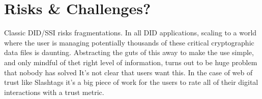 \section{Risks \& Challenges?}
Classic DID/SSI risks fragmentations. 
In all DID applications, scaling to a world where the user is managing potentially thousands of these critical cryptographic data files is daunting.
Abstracting the guts of this away to make the use simple, and only mindful of thet right level of information, turns out to be huge problem that nobody has solved
It's not clear that users want this. 
In the case of web of trust like Slashtags it's a big piece of work for the users to rate all of their digital interactions with a trust metric.


